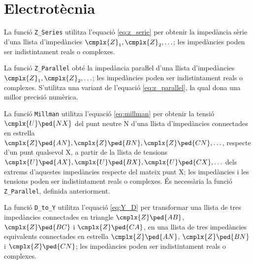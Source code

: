 \section{Electrotècnia}\label{sec:HP_ELC}

La funció \texttt{Z\_Series} utilitza l'equació \eqref{eq:z_serie} per obtenir la impedància sèrie d'una llista d'impedàncies $\cmplx{Z}_1, \cmplx{Z}_2, \ldots$; les impedàncies poden ser indistintament reals o complexes.




La funció \texttt{Z\_Parallel} obté la impedància paraŀlel  d'una llista d'impedàncies $\cmplx{Z}_1, \cmplx{Z}_2, \ldots$; les impedàncies poden ser indistintament reals o complexes. S'utilitza una variant de l'equació \eqref{eq:z_parallel}, la qual dona una millor precisió numèrica.




La funció \texttt{Millman} utilitza l'equació \eqref{eq:millman} per obtenir la tensió $\cmplx{U}\ped{NX}$ del punt neutre N d'una llista d'impedàncies connectades en estrella $\cmplx{Z}\ped{AN}, \cmplx{Z}\ped{BN}, \cmplx{Z}\ped{CN}, \ldots$, respecte d'un punt qualsevol X, a partir de la llista de tensions $\cmplx{U}\ped{AX}, \cmplx{U}\ped{BX}, \cmplx{U}\ped{CX}, \ldots$ dels extrems d'aquestes impedàncies respecte del mateix punt X; les impedàncies i les tensions poden ser indistintament reals o complexes. És necessària la funció \texttt{Z\_Parallel}, definida anteriorment.




La funció \texttt{D\_to\_Y} utilitza l'equació \eqref{eq:Y_D} per transformar una llista de tres impedàncies connectades en triangle $\cmplx{Z}\ped{AB}$, $\cmplx{Z}\ped{BC}$ i  $\cmplx{Z}\ped{CA}$, en una llista de tres impedàncies equivalents connectades en estrella $\cmplx{Z}\ped{AN}$, $\cmplx{Z}\ped{BN}$ i $\cmplx{Z}\ped{CN}$; les impedàncies poden ser indistintament reals o complexes.




